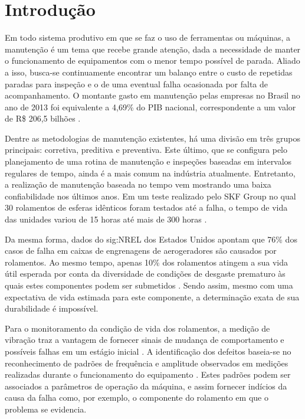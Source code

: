 \documentclass[12pt,oneside,english,brazil,lmodern,siglas,simbolos,cite=num]{ucsmonograph}
\begin{document}
	
	\textual %
	
	\chapter{Introdução}
	Em todo sistema produtivo em que se faz o uso de ferramentas ou máquinas, a manutenção é um tema que recebe grande atenção, dada a necessidade de manter o funcionamento de equipamentos com o menor tempo possível de parada.
	Aliado a isso, busca-se continuamente encontrar um balanço entre o custo de repetidas paradas para inspeção e o de uma eventual falha ocasionada por falta de acompanhamento.
	O montante gasto em manutenção pelas empresas no Brasil no ano de 2013 foi equivalente a 4,69\% do PIB nacional, correspondente a um valor de R\$ 206,5 bilhões \cite{seleme:2015}.
	
	Dentre as metodologias de manutenção existentes, há uma divisão em três grupos principais: corretiva, preditiva e preventiva.
	Este último, que se configura pelo planejamento de uma rotina de manutenção e inspeções baseadas em intervalos regulares de tempo, ainda é a mais comum na indústria atualmente.
	Entretanto, a realização de manutenção baseada no tempo vem mostrando uma baixa confiabilidade nos últimos anos.
	Em um teste realizado pelo SKF Group no qual 30 rolamentos de esferas idênticos foram testados até a falha, o tempo de vida das unidades variou de 15 horas até mais de 300 horas \cite{hashemian:2011}.
	 
	Da mesma forma, dados do \gls{sig:NREL} dos Estados Unidos apontam que 76\% dos casos de falha em caixas de engrenagens de aerogeradores são causados por rolamentos.
	Ao mesmo tempo, apenas 10\% dos rolamentos atingem a sua vida útil esperada por conta da diversidade de condições de desgaste prematuro às quais estes componentes podem ser submetidos \cite{peeters:2018}.
	Sendo assim, mesmo com uma expectativa de vida estimada para este componente, a determinação exata de sua durabilidade é impossível.
	
	Para o monitoramento da condição de vida dos rolamentos, a medição de vibração traz a vantagem de fornecer sinais de mudança de comportamento e possíveis falhas em um estágio inicial \cite{al-najjar:2004}.
	A identificação dos defeitos baseia-se no reconhecimento de padrões de frequência e amplitude observados em medições realizadas durante o funcionamento do equipamento \cite{carden:2004}.
	Estes padrões podem ser associados a parâmetros de operação da máquina, e assim fornecer indícios da causa da falha como, por exemplo, o componente do rolamento em que o problema se evidencia.
	
\end{document}
